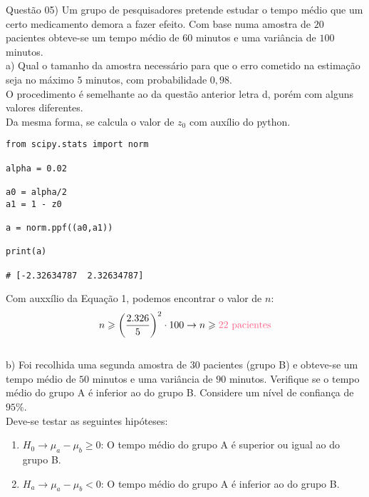 
\noindent \textcolor{COLOR1}{Questão 05)} Um grupo de pesquisadores pretende estudar o tempo médio que um certo medicamento demora a fazer efeito. Com base numa amostra de $20$ pacientes obteve-se um tempo médio de $60$ minutos e uma variância de $100$ minutos.
\\

a) Qual o tamanho da amostra necessário para que o erro cometido na estimação seja no máximo $5$ minutos, com probabilidade $0,98$.
\\

O procedimento é semelhante ao da questão anterior letra d, porém com alguns valores diferentes.\\

Da mesma forma, se calcula o valor de $z_0$ com auxílio do python.\\

\begin{lstlisting}
from scipy.stats import norm
        
alpha = 0.02
                
a0 = alpha/2
a1 = 1 - z0
        
a = norm.ppf((a0,a1))
                
print(a)
        
# [-2.32634787  2.32634787]
\end{lstlisting}

Com auxxílio da Equação 1, podemos encontrar o valor de $n$:
\\

\[
    n\geqslant \biggl(\frac{2.326}{5}\biggr)^2 \cdot 100 \to n\geqslant \textcolor{COLOR2}{22\ \text{pacientes}}
\]
\\

b) Foi recolhida uma segunda amostra de $30$ pacientes (grupo B) e obteve-se um tempo médio de $50$ minutos e uma variância de $90$ minutos. Verifique se o tempo médio do grupo A é inferior ao do grupo B. Considere um nível de confiança de $95\%$.
\\

Deve-se testar as seguintes hipóteses:

\begin{enumerate}
    \item $H_0\to \mu_a - \mu_b\geqslant 0$: O tempo médio do grupo A é superior ou igual ao do grupo B.
    \item $H_a\to \mu_a - \mu_b< 0$: O tempo médio do grupo A é inferior ao do grupo B.
\end{enumerate}

